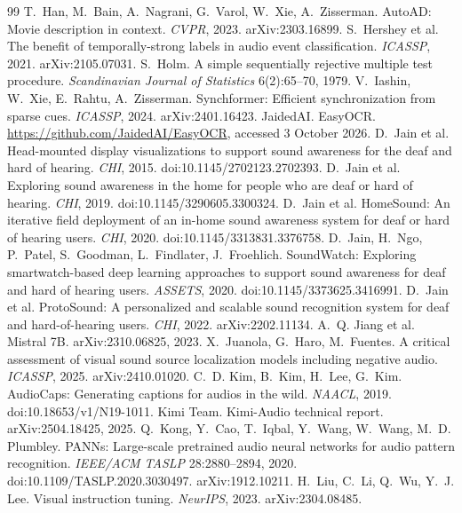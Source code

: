 \begin{thebibliography}{99}
 T.~Han, M.~Bain, A.~Nagrani, G.~Varol, W.~Xie, A.~Zisserman. AutoAD: Movie description in context. \emph{CVPR}, 2023. arXiv:2303.16899.
 S.~Hershey et al. The benefit of temporally-strong labels in audio event classification. \emph{ICASSP}, 2021. arXiv:2105.07031.
 S.~Holm. A simple sequentially rejective multiple test procedure. \emph{Scandinavian Journal of Statistics} 6(2):65--70, 1979.
 V.~Iashin, W.~Xie, E.~Rahtu, A.~Zisserman. Synchformer: Efficient synchronization from sparse cues. \emph{ICASSP}, 2024. arXiv:2401.16423.
 JaidedAI. EasyOCR. \url{https://github.com/JaidedAI/EasyOCR}, accessed 3 October 2026.
 D.~Jain et al. Head-mounted display visualizations to support sound awareness for the deaf and hard of hearing. \emph{CHI}, 2015. doi:10.1145/2702123.2702393.
 D.~Jain et al. Exploring sound awareness in the home for people who are deaf or hard of hearing. \emph{CHI}, 2019. doi:10.1145/3290605.3300324.
 D.~Jain et al. HomeSound: An iterative field deployment of an in-home sound awareness system for deaf or hard of hearing users. \emph{CHI}, 2020. doi:10.1145/3313831.3376758.
 D.~Jain, H.~Ngo, P.~Patel, S.~Goodman, L.~Findlater, J.~Froehlich. SoundWatch: Exploring smartwatch-based deep learning approaches to support sound awareness for deaf and hard of hearing users. \emph{ASSETS}, 2020. doi:10.1145/3373625.3416991.
 D.~Jain et al. ProtoSound: A personalized and scalable sound recognition system for deaf and hard-of-hearing users. \emph{CHI}, 2022. arXiv:2202.11134.
 A.~Q. Jiang et al. Mistral 7B. arXiv:2310.06825, 2023.
 X.~Juanola, G.~Haro, M.~Fuentes. A critical assessment of visual sound source localization models including negative audio. \emph{ICASSP}, 2025. arXiv:2410.01020.
 C.~D. Kim, B.~Kim, H.~Lee, G.~Kim. AudioCaps: Generating captions for audios in the wild. \emph{NAACL}, 2019. doi:10.18653/v1/N19-1011.
 Kimi Team. Kimi-Audio technical report. arXiv:2504.18425, 2025.
 Q.~Kong, Y.~Cao, T.~Iqbal, Y.~Wang, W.~Wang, M.~D. Plumbley. PANNs: Large-scale pretrained audio neural networks for audio pattern recognition. \emph{IEEE/ACM TASLP} 28:2880--2894, 2020. doi:10.1109/TASLP.2020.3030497. arXiv:1912.10211.
 H.~Liu, C.~Li, Q.~Wu, Y.~J. Lee. Visual instruction tuning. \emph{NeurIPS}, 2023. arXiv:2304.08485.

\end{thebibliography}
